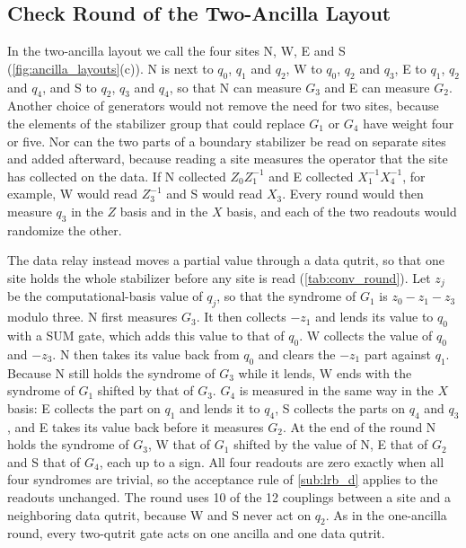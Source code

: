 \subsection{Check Round of the Two-Ancilla Layout}
\label{app:rounds-relay}

In the two-ancilla layout we call the four sites N, W, E and S (\autoref{fig:ancilla_layouts}(c)). N is next to $q_0$, $q_1$ and $q_2$, W to $q_0$, $q_2$ and $q_3$, E to $q_1$, $q_2$ and $q_4$, and S to $q_2$, $q_3$ and $q_4$, so that N can measure $G_3$ and E can measure $G_2$. Another choice of generators would not remove the need for two sites, because the elements of the stabilizer group that could replace $G_1$ or $G_4$ have weight four or five. Nor can the two parts of a boundary stabilizer be read on separate sites and added afterward, because reading a site measures the operator that the site has collected on the data. If N collected $Z_0 Z_1^{-1}$ and E collected $X_1^{-1} X_4^{-1}$, for example, W would read $Z_3^{-1}$ and S would read $X_3$. Every round would then measure $q_3$ in the $Z$ basis and in the $X$ basis, and each of the two readouts would randomize the other.

The data relay instead moves a partial value through a data qutrit, so that one site holds the whole stabilizer before any site is read (\autoref{tab:conv_round}). Let $z_j$ be the computational-basis value of $q_j$, so that the syndrome of $G_1$ is $z_0 - z_1 - z_3$ modulo three. N first measures $G_3$. It then collects $-z_1$ and lends its value to $q_0$ with a SUM gate, which adds this value to that of $q_0$. W collects the value of $q_0$ and $-z_3$. N then takes its value back from $q_0$ and clears the $-z_1$ part against $q_1$. Because N still holds the syndrome of $G_3$ while it lends, W ends with the syndrome of $G_1$ shifted by that of $G_3$. $G_4$ is measured in the same way in the $X$ basis: E collects the part on $q_1$ and lends it to $q_4$, S collects the parts on $q_4$ and $q_3$, and E takes its value back before it measures $G_2$. At the end of the round N holds the syndrome of $G_3$, W that of $G_1$ shifted by the value of N, E that of $G_2$ and S that of $G_4$, each up to a sign. All four readouts are zero exactly when all four syndromes are trivial, so the acceptance rule of \autoref{sub:lrb_d} applies to the readouts unchanged. The round uses 10 of the 12 couplings between a site and a neighboring data qutrit, because W and S never act on $q_2$. As in the one-ancilla round, every two-qutrit gate acts on one ancilla and one data qutrit.

